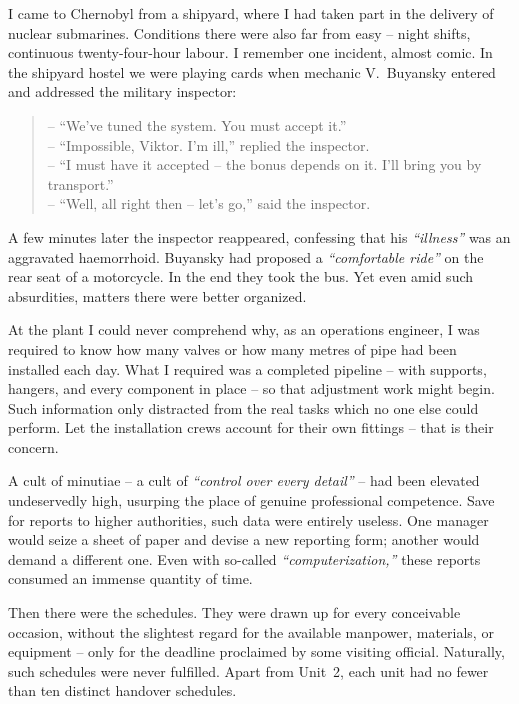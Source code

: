 \documentclass[openright]{bookest}
\begin{document}
I came to Chernobyl from a shipyard, where I had taken part in the delivery of nuclear submarines. Conditions there were also far from easy -- night shifts, continuous twenty-four-hour labour. I remember one incident, almost comic. In the shipyard hostel we were playing cards when mechanic V.~Buyansky entered and addressed the military inspector:

\begin{quote}
-- ``We've tuned the system. You must accept it.''\\
-- ``Impossible, Viktor. I'm ill,'' replied the inspector.\\
-- ``I must have it accepted -- the bonus depends on it. I'll bring you by transport.''\\
-- ``Well, all right then -- let's go,'' said the inspector.
\end{quote}

A few minutes later the inspector reappeared, confessing that his \textit{``illness''} was an aggravated haemorrhoid. Buyansky had proposed a \textit{``comfortable ride''} on the rear seat of a motorcycle. In the end they took the bus. Yet even amid such absurdities, matters there were better organized.


At the plant I could never comprehend why, as an operations engineer, I was required to know how many valves or how many metres of pipe had been installed each day. What I required was a completed pipeline -- with supports, hangers, and every component in place -- so that adjustment work might begin. Such information only distracted from the real tasks which no one else could perform. Let the installation crews account for their own fittings -- that is their concern.

A cult of minutiae -- a cult of \textit{``control over every detail''} -- had been elevated undeservedly high, usurping the place of genuine professional competence. Save for reports to higher authorities, such data were entirely useless. One manager would seize a sheet of paper and devise a new reporting form; another would demand a different one. Even with so-called \textit{``computerization,''} these reports consumed an immense quantity of time.


Then there were the schedules. They were drawn up for every conceivable occasion, without the slightest regard for the available manpower, materials, or equipment -- only for the deadline proclaimed by some visiting official. Naturally, such schedules were never fulfilled. Apart from Unit~2, each unit had no fewer than ten distinct handover schedules.
\end{document}
